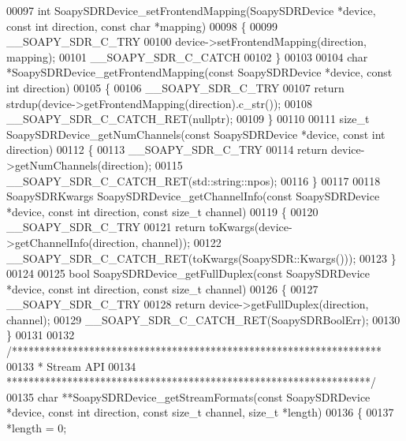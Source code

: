 \begin{DoxyCode}
00097 \textcolor{keywordtype}{int} SoapySDRDevice_setFrontendMapping(SoapySDRDevice *device, \textcolor{keyword}{const} \textcolor{keywordtype}{int} direction, \textcolor{keyword}{const} \textcolor{keywordtype}{char} *mapping)
00098 \{
00099     __SOAPY_SDR_C_TRY
00100     device->setFrontendMapping(direction, mapping);
00101     __SOAPY_SDR_C_CATCH
00102 \}
00103 
00104 \textcolor{keywordtype}{char} *SoapySDRDevice_getFrontendMapping(\textcolor{keyword}{const} SoapySDRDevice *device, \textcolor{keyword}{const} \textcolor{keywordtype}{int} direction)
00105 \{
00106     __SOAPY_SDR_C_TRY
00107     \textcolor{keywordflow}{return} strdup(device->getFrontendMapping(direction).c\_str());
00108     __SOAPY_SDR_C_CATCH_RET(\textcolor{keyword}{nullptr});
00109 \}
00110 
00111 \textcolor{keywordtype}{size\_t} SoapySDRDevice_getNumChannels(\textcolor{keyword}{const} SoapySDRDevice *device, \textcolor{keyword}{const} \textcolor{keywordtype}{int} direction)
00112 \{
00113     __SOAPY_SDR_C_TRY
00114     \textcolor{keywordflow}{return} device->getNumChannels(direction);
00115     __SOAPY_SDR_C_CATCH_RET(std::string::npos);
00116 \}
00117 
00118 SoapySDRKwargs SoapySDRDevice_getChannelInfo(\textcolor{keyword}{const} SoapySDRDevice *device, \textcolor{keyword}{const} \textcolor{keywordtype}{int} direction, \textcolor{keyword}{const} \textcolor{keywordtype}{
      size\_t} channel)
00119 \{
00120     __SOAPY_SDR_C_TRY
00121     \textcolor{keywordflow}{return} toKwargs(device->getChannelInfo(direction, channel));
00122     __SOAPY_SDR_C_CATCH_RET(toKwargs(SoapySDR::Kwargs()));
00123 \}
00124 
00125 \textcolor{keywordtype}{bool} SoapySDRDevice_getFullDuplex(\textcolor{keyword}{const} SoapySDRDevice *device, \textcolor{keyword}{const} \textcolor{keywordtype}{int} direction, \textcolor{keyword}{const} \textcolor{keywordtype}{size\_t} channel)
00126 \{
00127     __SOAPY_SDR_C_TRY
00128     \textcolor{keywordflow}{return} device->getFullDuplex(direction, channel);
00129     __SOAPY_SDR_C_CATCH_RET(SoapySDRBoolErr);
00130 \}
00131 
00132 \textcolor{comment}{/*******************************************************************}
00133 \textcolor{comment}{ * Stream API}
00134 \textcolor{comment}{ ******************************************************************/}
00135 \textcolor{keywordtype}{char} **SoapySDRDevice_getStreamFormats(\textcolor{keyword}{const} SoapySDRDevice *device, \textcolor{keyword}{const} \textcolor{keywordtype}{int} direction, \textcolor{keyword}{const} \textcolor{keywordtype}{size\_t} 
      channel, \textcolor{keywordtype}{size\_t} *length)
00136 \{
00137     *length = 0;

\end{DoxyCode}
